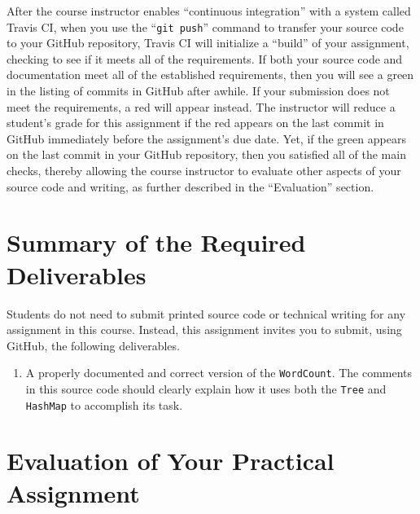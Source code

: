 \documentclass[11pt]{article}
\newcommand{\mainprogram}{\lstinline{WordCount}}
\newcommand{\gitpush}{\command{git push}}
\newcommand{\command}[1]{``\lstinline{#1}''}
\newcommand{\program}[1]{\lstinline{#1}}
\newcommand{\step}[1]{``{#1}''}
\newcommand{\checkmark}{\ding{51}}
\newcommand{\naughtmark}{\ding{55}}
\begin{document}
After the course instructor enables \step{continuous integration} with a system
called Travis CI, when you use the \gitpush{} command to transfer your source
code to your GitHub repository, Travis CI will initialize a \step{build} of your
assignment, checking to see if it meets all of the requirements. If both your
source code and documentation meet all of the established requirements, then you
will see a green \checkmark{} in the listing of commits in GitHub after awhile.
If your submission does not meet the requirements, a red \naughtmark{} will
appear instead. The instructor will reduce a student's grade for this assignment
if the red \naughtmark{} appears on the last commit in GitHub immediately before
the assignment's due date. Yet, if the green \checkmark{} appears on the last
commit in your GitHub repository, then you satisfied all of the main checks,
thereby allowing the course instructor to evaluate other aspects of your source
code and writing, as further described in the \step{Evaluation} section.

\section*{Summary of the Required Deliverables}

\noindent Students do not need to submit printed source code or technical
writing for any assignment in this course. Instead, this assignment invites you
to submit, using GitHub, the following deliverables.

\vspace*{-.1in}

\begin{enumerate}

  \setlength{\itemsep}{0in}

\item A properly documented and correct version of the \mainprogram{}. The
  comments in this source code should clearly explain how it uses both the
  \program{Tree} and \program{HashMap} to accomplish its task.

\end{enumerate}

\vspace*{-.2in}

\section*{Evaluation of Your Practical Assignment}
\end{document}
